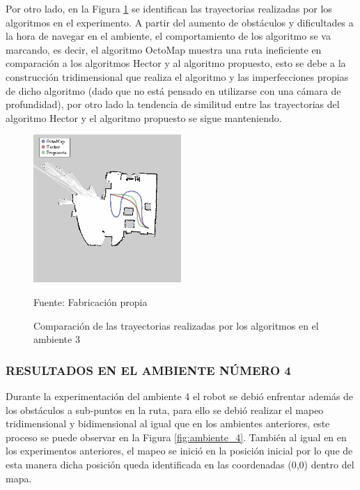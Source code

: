 Por otro lado, en la Figura \ref{fig:tray_03} se identifican las trayectorias realizadas por los algoritmos en el experimento. A partir del aumento de obstáculos y dificultades a la hora de navegar en el ambiente, el comportamiento de los algoritmo se va marcando, es decir, el algoritmo OctoMap muestra una ruta ineficiente en comparación a los algoritmos Hector y al algoritmo propuesto, esto se debe a la construcción tridimensional que realiza el algoritmo y las imperfecciones propias de dicho algoritmo (dado que no está pensado en utilizarse con una cámara de profundidad), por otro lado la tendencia de similitud entre las trayectorias del algoritmo Hector y el algoritmo propuesto se sigue manteniendo.

\begin{figure}[h]
    \centering
    \includegraphics[width=0.5\textwidth]{figures/05experimentacion/r02.png}
    \caption{ Comparación de las trayectorias realizadas por los algoritmos en el ambiente 3} 
    \label{fig:tray_03}
    Fuente: Fabricación propia
\end{figure}

\newpage
\subsubsection{RESULTADOS EN EL AMBIENTE NÚMERO 4}

Durante la experimentación del ambiente 4 el robot se debió enfrentar además de los obstáculos a sub-puntos en la ruta, para ello se debió realizar el mapeo tridimensional y bidimensional al igual que en los ambientes anteriores, este proceso se puede observar en la Figura \ref{fig:ambiente_4}. También al igual en en los experimentos anteriores, el mapeo se inició en la posición inicial por lo que de esta manera dicha posición queda identificada en las coordenadas (0,0) dentro del mapa.



